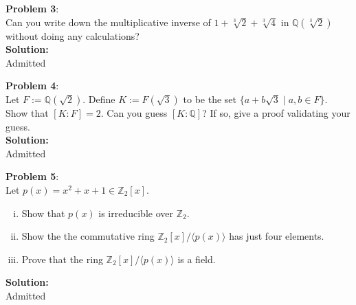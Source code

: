 \documentclass[11pt]{article}
\newcommand{\prob}[3]{\begin{flushleft}
        \textbf{Problem #1}: \\
        #2 
		\textbf{Solution:} 
		#3

\end{flushleft}}
\newcommand{\lr}[1]{
  \langle #1 \rangle
}
\begin{document}
\prob{3}{
  Can you write down the multiplicative inverse of $1 + \sqrt[3]{2} + \sqrt[3]{4}$ in $\mathbb{Q}(\sqrt[3]{2})$ without doing any calculations? \\
}{\\
  Admitted
}

\prob{4}{
  Let $F := \mathbb{Q}(\sqrt{2})$. Define $K := F(\sqrt{3})$ to be the set $\{ a + b \sqrt{3} \mid a, b \in F \}$. Show that $[K : F] = 2$.
  Can you guess $[K : \mathbb{Q}]$? If so, give a proof validating your guess. \\
}{\\
  Admitted
}

\prob{5}{
Let $p(x) = x^2 + x + 1 \in \mathbb{Z}_2[x]$.
\begin{enumerate}[(i)]
  \item Show that $p(x)$ is irreducible over $\mathbb{Z}_2$.
  \item Show the the commutative ring $\mathbb{Z}_2[x] / \lr{p(x)}$ has just four elements.
  \item Prove that the ring $\mathbb{Z}_2[x] / \lr{p(x)}$ is a field.
\end{enumerate}
}{\\
Admitted
}
\end{document}
